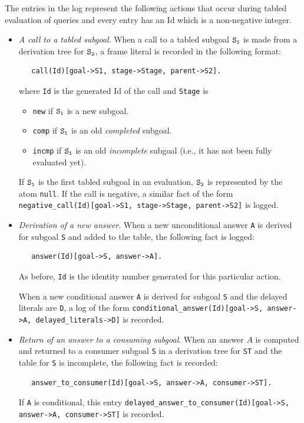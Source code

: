 \documentclass[11pt]{article}
\begin{document}
The entries in the log represent the following actions that occur during
tabled evaluation of queries and every entry has an Id which is a
non-negative integer. 

\begin{itemize}
\item \emph{A call to a tabled subgoal}. When a call to a tabled subgoal $\tt S_1$ is
  made from a derivation tree for $\tt S_2$, a frame literal is recorded in
  the following format:
\begin{verbatim}
   call(Id)[goal->S1, stage->Stage, parent->S2].
\end{verbatim}
  where {\tt Id} is the generated Id of the call and {\tt Stage} is
  \begin{itemize}
  \item {\tt new} if $\tt S_1$ is a new subgoal.
  \item {\tt comp} if $\tt S_1$ is an old \emph{completed} subgoal.
  \item {\tt incmp} if $\tt S_1$ is an old \emph{incomplete} subgoal (i.e., it
    has not been fully evaluated yet).
  \end{itemize}

  If $\tt S_1$ is the first tabled subgoal in an evaluation, $\tt S_2$ is
  represented by the atom {\tt null}.
  If the call is negative, a similar fact of the form
  {\tt negative\_call(Id)[goal->S1, stage->Stage, parent->S2]} is logged. 
  
\item \emph{Derivation of a new answer}. When a new unconditional
  answer {\tt A} is derived for  
  subgoal \texttt{S}  and added to the table, the following fact is logged:
\begin{verbatim}
   answer(Id)[goal->S, answer->A].
\end{verbatim}
  As before, {\tt Id} is the identity number generated for this particular
  action. 

  When a new conditional answer {\tt A} is derived for subgoal \texttt{S}
  and the delayed literals are {\tt D}, a log of the form
  {\tt conditional\_answer(Id)[goal->S, answer->A, delayed\_literals->D]}
  is recorded. 

\item \emph{Return of an answer to a consuming subgoal}. When an answer $A$ is
  computed and
  returned to a consumer subgoal \texttt{S} in a derivation tree for
  \texttt{ST}  and the
  table for \texttt{S}
  is incomplete, the following fact is recorded:
\begin{verbatim}  
   answer_to_consumer(Id)[goal->S, answer->A, consumer->ST].
\end{verbatim}  
  If \texttt{A} is conditional, this entry
  {\tt delayed\_answer\_to\_consumer(Id)[goal->S, answer->A, consumer->ST]} 
  is recorded. 


\end{itemize}
\end{document}
